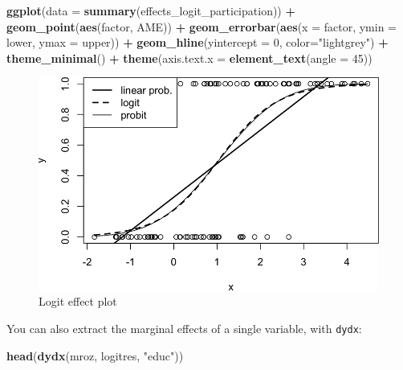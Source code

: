 \documentclass[]{book}
\newenvironment{Shaded}{\begin{snugshade}}{\end{snugshade}}
\newcommand{\DataTypeTok}[1]{\textcolor[rgb]{0.13,0.29,0.53}{#1}}
\newcommand{\DecValTok}[1]{\textcolor[rgb]{0.00,0.00,0.81}{#1}}
\newcommand{\KeywordTok}[1]{\textcolor[rgb]{0.13,0.29,0.53}{\textbf{#1}}}
\newcommand{\NormalTok}[1]{#1}
\newcommand{\OperatorTok}[1]{\textcolor[rgb]{0.81,0.36,0.00}{\textbf{#1}}}
\newcommand{\StringTok}[1]{\textcolor[rgb]{0.31,0.60,0.02}{#1}}
\begin{document}
\begin{Shaded}
\begin{Highlighting}[]
\KeywordTok{ggplot}\NormalTok{(}\DataTypeTok{data =} \KeywordTok{summary}\NormalTok{(effects_logit_participation)) }\OperatorTok{+}
\StringTok{  }\KeywordTok{geom_point}\NormalTok{(}\KeywordTok{aes}\NormalTok{(factor, AME)) }\OperatorTok{+}
\StringTok{  }\KeywordTok{geom_errorbar}\NormalTok{(}\KeywordTok{aes}\NormalTok{(}\DataTypeTok{x =}\NormalTok{ factor, }\DataTypeTok{ymin =}\NormalTok{ lower, }\DataTypeTok{ymax =}\NormalTok{ upper)) }\OperatorTok{+}
\StringTok{  }\KeywordTok{geom_hline}\NormalTok{(}\DataTypeTok{yintercept =} \DecValTok{0}\NormalTok{, }\DataTypeTok{color=}\StringTok{"lightgrey"}\NormalTok{) }\OperatorTok{+}
\StringTok{  }\KeywordTok{theme_minimal}\NormalTok{() }\OperatorTok{+}
\StringTok{  }\KeywordTok{theme}\NormalTok{(}\DataTypeTok{axis.text.x =} \KeywordTok{element_text}\NormalTok{(}\DataTypeTok{angle =} \DecValTok{45}\NormalTok{))}
\end{Highlighting}
\end{Shaded}

\begin{figure}

{\centering \includegraphics[width=0.8\linewidth]{MEM5220_R_files/figure-latex/fig22-1} 

}

\caption{Logit effect plot}\label{fig:fig22}
\end{figure}

You can also extract the marginal effects of a single variable, with
\texttt{dydx}:

\begin{Shaded}
\begin{Highlighting}[]
\KeywordTok{head}\NormalTok{(}\KeywordTok{dydx}\NormalTok{(mroz, logitres, }\StringTok{"educ"}\NormalTok{))}
\end{Highlighting}
\end{Shaded}
\end{document}
